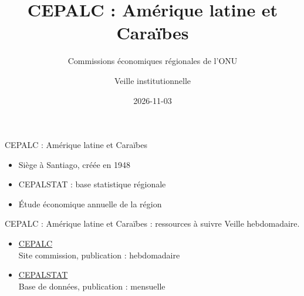 \documentclass[aspectratio=169,11pt]{beamer}
\title{CEPALC : Amérique latine et Caraïbes}
\subtitle{Commissions économiques régionales de l'ONU}
\author{Veille institutionnelle}
\date{2026-11-03}
\begin{document}
\begin{frame}\titlepage\end{frame}

\begin{frame}{CEPALC : Amérique latine et Caraïbes}
\begin{itemize}
\item Siège à Santiago, créée en 1948
\item CEPALSTAT : base statistique régionale
\item Étude économique annuelle de la région
\end{itemize}
\end{frame}

\begin{frame}{CEPALC : Amérique latine et Caraïbes : ressources à suivre}
\small
Veille hebdomadaire.
\begin{itemize}
\item \href{https://www.cepal.org}{CEPALC}\\{\footnotesize Site commission, publication : hebdomadaire}
\item \href{https://statistics.cepal.org}{CEPALSTAT}\\{\footnotesize Base de données, publication : mensuelle}
\end{itemize}
\end{frame}
\end{document}
